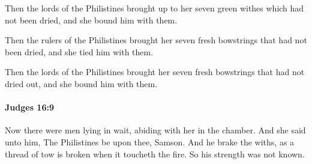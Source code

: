 			\begin{versebox}
					\item[BHS] 
					\item[ASV] Then the lords of the Philistines brought up to her seven green withes which had not been dried, and she bound him with them.
					\item[NIV] Then the rulers of the Philistines brought her seven fresh bowstrings that had not been dried, and she tied him with them.
					\item[NRSV] Then the lords of the Philistines brought her seven fresh bowstrings that had not dried out, and she bound him with them.
			\end{versebox}

		\paragraph{Judges 16:9} %
			\label{JUDGES-16-9}

			Now there were men lying in wait, abiding with her in the chamber. And she said unto him, The Philistines be upon thee, Samson. And he brake the withs, as a thread of tow is broken when it toucheth the fire. So his strength was not known.

